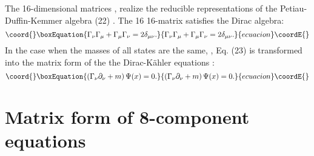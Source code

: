 \documentclass[a4paper,12pt]{article}
\begin{document}
The 16-dimensional matrices \myHighlight{$\beta _\nu ^{(+)}$}\coordHE{}, \myHighlight{$\beta _\nu
^{(-)}$}\coordHE{} realize the reducible representations of the
Petiau-Duffin-Kemmer algebra (22) \cite{Borgardt}. The 16\myHighlight{$\times$}\coordHE{}
16-matrix \myHighlight{$\Gamma _\nu $}\coordHE{} satisfies the Dirac algebra:
\begin{equation}\coord{}\boxEquation{
\Gamma _\nu \Gamma _\mu +\Gamma _\mu \Gamma _\nu =2\delta _{\mu
\nu } .\label{23}
}{
\Gamma _\nu \Gamma _\mu +\Gamma _\mu \Gamma _\nu =2\delta _{\mu
\nu } .}{ecuacion}\coordE{}\end{equation}
In the case when the masses of all states are the same, \coordHE{},
Eq. (23) is transformed into the matrix form of the the
Dirac-K\"ahler equations \cite{Kruglov1}:
\begin{equation}\coord{}\boxEquation{
\left( \Gamma _\nu \partial _\nu +m\right) \Psi (x)=0 .\label{24}
}{
\left( \Gamma _\nu \partial _\nu +m\right) \Psi (x)=0 .}{ecuacion}\coordE{}\end{equation}

\section{Matrix form of 8-component equations}
\end{document}
